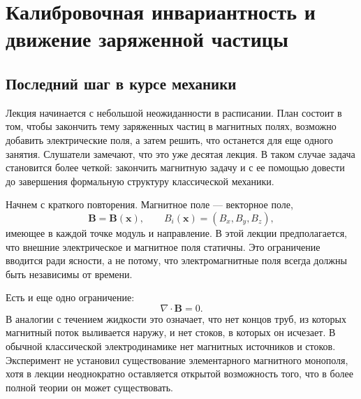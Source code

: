 \chapter{Калибровочная инвариантность и движение заряженной частицы}


\section{Последний шаг в курсе механики}

Лекция начинается с небольшой неожиданности в расписании. План состоит в том, чтобы закончить тему заряженных частиц в магнитных полях, возможно добавить электрические поля, а затем решить, что останется для еще одного занятия. Слушатели замечают, что это уже десятая лекция. В таком случае задача становится более четкой: закончить магнитную задачу и с ее помощью довести до завершения формальную структуру классической механики.

Начнем с краткого повторения. Магнитное поле — векторное поле,
\begin{equation}
  \mathbf B=\mathbf B(\mathbf x),
  \qquad
  B_i(\mathbf x)=(B_x,B_y,B_z),
\end{equation}
имеющее в каждой точке модуль и направление. В этой лекции предполагается, что внешние электрическое и магнитное поля статичны. Это ограничение вводится ради ясности, а не потому, что электромагнитные поля всегда должны быть независимы от времени.

Есть и еще одно ограничение:
\begin{equation}
  \nabla\cdot\mathbf B=0.
\end{equation}
В аналогии с течением жидкости это означает, что нет концов труб, из которых магнитный поток выливается наружу, и нет стоков, в которых он исчезает. В обычной классической электродинамике нет магнитных источников и стоков. Эксперимент не установил существование элементарного магнитного монополя, хотя в лекции неоднократно оставляется открытой возможность того, что в более полной теории он может существовать.

